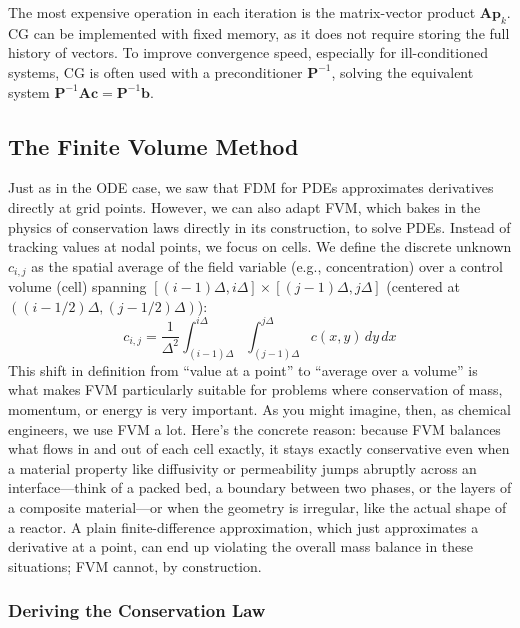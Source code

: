 The most expensive operation in each iteration is the matrix-vector product $\mathbf{A}\mathbf{p}_k$. CG can be implemented with fixed memory, as it does not require storing the full history of vectors. To improve convergence speed, especially for ill-conditioned systems, CG is often used with a preconditioner $\mathbf{P}^{-1}$, solving the equivalent system $\mathbf{P}^{-1}\mathbf{Ac} = \mathbf{P}^{-1}\mathbf{b}$.


\subsection{The Finite Volume Method}

Just as in the ODE case, we saw that FDM for PDEs approximates derivatives directly at grid points. However, we can also adapt FVM, which bakes in the physics of conservation laws directly in its construction, to solve PDEs. Instead of tracking values at nodal points, we focus on cells. We define the discrete unknown $c_{i,j}$ as the spatial average of the field variable (e.g., concentration) over a control volume (cell) spanning $[(i-1)\Delta, i\Delta] \times [(j-1)\Delta, j\Delta]$ (centered at $((i-1/2)\Delta, (j-1/2)\Delta)$):
\begin{equation}
    c_{i,j} = \frac{1}{\Delta^2} \int_{(i-1)\Delta}^{i\Delta} \int_{(j-1)\Delta}^{j\Delta} c(x,y) \, dy \, dx
\end{equation}
This shift in definition from ``value at a point'' to ``average over a volume'' is what makes FVM particularly suitable for problems where conservation of mass, momentum, or energy is very important. As you might imagine, then, as chemical engineers, we use FVM a lot. Here's the concrete reason: because FVM balances what flows in and out of each cell exactly, it stays exactly conservative even when a material property like diffusivity or permeability jumps abruptly across an interface---think of a packed bed, a boundary between two phases, or the layers of a composite material---or when the geometry is irregular, like the actual shape of a reactor. A plain finite-difference approximation, which just approximates a derivative at a point, can end up violating the overall mass balance in these situations; FVM cannot, by construction.

\subsubsection{Deriving the Conservation Law}

